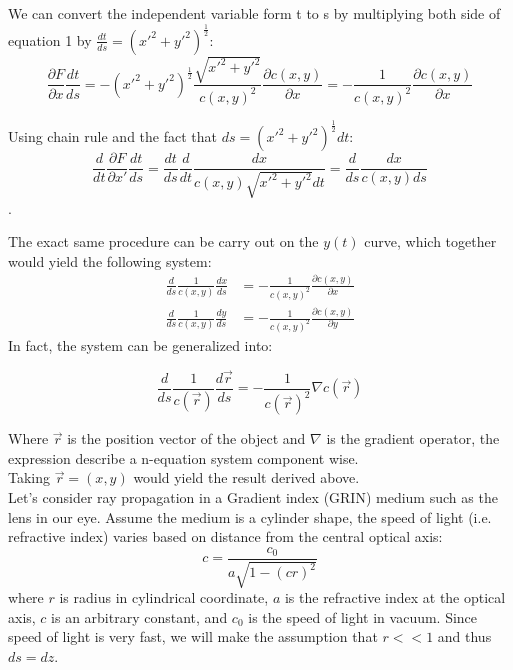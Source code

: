 \documentclass[%
 amsmath,amssymb,
aps,
 fleqn,
 notitlepage,
]{revtex4-2}
\begin{document}
We can convert the independent variable form t to s by multiplying both side of equation 1 by $\frac{dt}{ds} = (x'^2+y'^2)^{\frac{1}{2}}$:
\[\frac{\partial F}{\partial x}\frac{dt}{ds} = -(x'^2+y'^2)^{\frac{1}{2}}\frac{\sqrt{x'^2+y'^2}}{c(x,y)^2}\frac{\partial c(x,y)}{\partial x} = -\frac{1}{c(x,y)^2}\frac{\partial c(x,y)}{\partial x}\]

Using chain rule and the fact that $ds = (x'^2+y'^2)^{\frac{1}{2}} dt$:
\[\frac{d}{d t} \frac{\partial F}{\partial x'} \frac{dt}{ds} = \frac{dt}{ds}\frac{d}{dt} \frac{dx}{c(x,y)\sqrt{x'^2+y'^2}dt} = \frac{d}{ds}\frac{dx}{c(x,y)ds}\].

The exact same procedure can be carry out on the $y(t)$ curve, which together would yield the following system:
\begin{align*}
\frac{d}{ds}\frac{1}{c(x,y)}\frac{dx}{ds} &= -\frac{1}{c(x,y)^2}\frac{\partial c(x,y)}{\partial x}\\
\frac{d}{ds}\frac{1}{c(x,y)}\frac{dy}{ds} &= -\frac{1}{c(x,y)^2}\frac{\partial c(x,y)}{\partial y}
\end{align*}
In fact, the system can be generalized into:

\[\frac{d}{ds} \frac{1}{c(\vec{r})}\frac{d\vec{r}}{ds} = -\frac{1}{c(\vec{r})^2}\nabla c(\vec{r})\]

Where $\vec{r}$ is the position vector of the object and $\nabla$ is the gradient operator, the expression describe a n-equation system component wise.\\
Taking $\vec{r} = (x,y)$ would yield the result derived above.\\

Let's consider ray propagation in a Gradient index (GRIN) medium such as the lens in our eye. Assume the medium is a cylinder shape, the speed of light (i.e. refractive index) varies based on distance from the central optical axis:
\[c = \frac{c_0}{a\sqrt{1-(cr)^2}}\]
where $r$ is radius in cylindrical coordinate, $a$ is the refractive index at the optical axis, $c$ is an arbitrary constant, and $c_0$ is the speed of light in vacuum. Since speed of light is very fast, we will make the assumption that $r << 1$ and thus $ds = dz$.
\end{document}
